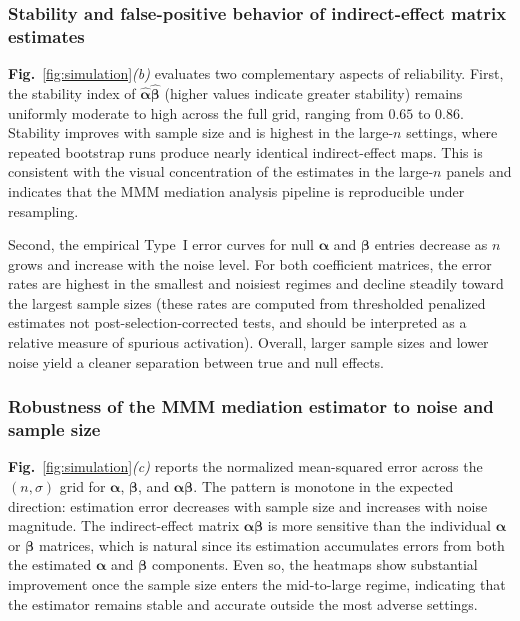 \documentclass[
  12pt]{article}
\begin{document}
\subsubsection{Stability and false-positive behavior of indirect-effect matrix estimates}
\textbf{Fig.}~\ref{fig:simulation}\textit{(b)} evaluates two complementary aspects of reliability.
First, the stability index of $\widehat{\bm{\alpha}}\widehat{\bm{\beta}}$ (higher values indicate greater stability) remains uniformly moderate to high across the full grid, ranging from $0.65$ to $0.86$.
Stability improves with sample size and is highest in the large-$n$ settings, where repeated bootstrap runs produce nearly identical indirect-effect maps.
This is consistent with the visual concentration of the estimates in the large-$n$ panels and indicates that the MMM mediation analysis pipeline is reproducible under resampling.

Second, the empirical Type~I error curves for null $\bm{\alpha}$ and $\bm{\beta}$ entries decrease as $n$ grows and increase with the noise level.
For both coefficient matrices, the error rates are highest in the smallest and noisiest regimes and decline steadily toward the largest sample sizes (these rates are computed from thresholded penalized estimates not post-selection-corrected tests, and should be interpreted as a relative measure of spurious activation). Overall, larger sample sizes and lower noise yield a cleaner separation between true and null effects. 

\subsubsection{Robustness of the MMM mediation estimator to noise and sample size}

\textbf{Fig.}~\ref{fig:simulation}\textit{(c)} reports the normalized mean-squared error across the $(n,\sigma)$ grid for $\bm{\alpha}$, $\bm{\beta}$, and $\bm{\alpha}\bm{\beta}$.
The pattern is monotone in the expected direction: estimation error decreases with sample size and increases with noise magnitude.
The indirect-effect matrix $\bm{\alpha}\bm{\beta}$ is more sensitive than the individual $\bm{\alpha}$ or $\bm{\beta}$ matrices, which is natural since its estimation accumulates errors from both  the estimated $\bm{\alpha}$ and $\bm{\beta}$ components.
Even so, the heatmaps show substantial improvement once the sample size enters the mid-to-large regime, indicating that the estimator remains stable and accurate outside the most adverse settings.
\end{document}
